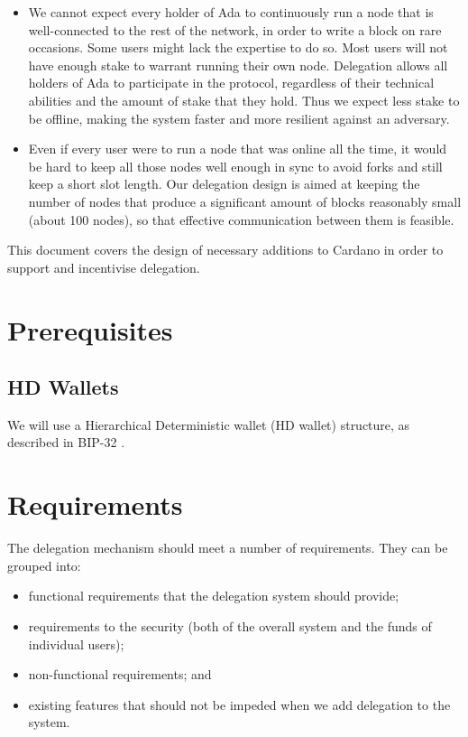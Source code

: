 \documentclass[11pt,a4paper]{article}
\begin{document}
\begin{itemize}
\item
  We cannot expect every holder of Ada to continuously run a node that
  is well-connected to the rest of the network, in order to write a
  block on rare occasions. Some users might lack the expertise to do so.
  Most users will not have enough stake to warrant running their own
  node. Delegation allows all holders of Ada to participate in the
  protocol, regardless of their technical abilities and the amount of
  stake that they hold. Thus we expect less stake to be offline, making
  the system faster and more resilient against an adversary.
\item
  Even if every user were to run a node that was online all the time, it
  would be hard to keep all those nodes well enough in sync to avoid
  forks and still keep a short slot length. Our delegation design is
  aimed at keeping the number of nodes that produce a significant amount
  of blocks reasonably small (about 100 nodes), so that effective
  communication between them is feasible.
\end{itemize}

This document covers the design of necessary additions to Cardano in
order to support and incentivise delegation.

\section{Prerequisites}
\label{prerequisites}

\subsection{HD Wallets}
\label{hd-wallets}

We will use a Hierarchical Deterministic wallet (HD wallet) structure,
as described in BIP-32 \citep{bip32}.

\section{Requirements}
\label{requirements}

The delegation mechanism should meet a number of requirements. They can
be grouped into:

\begin{itemize}
\item
  functional requirements that the delegation system should provide;
\item
  requirements to the security (both of the overall system and the funds
  of individual users);
\item
  non-functional requirements; and
\item
  existing features that should not be impeded when we add delegation to
  the system.
\end{itemize}
\end{document}
